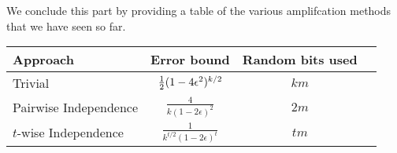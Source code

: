 We conclude this part by providing a table of the various amplifcation methods that we have seen so far.

\renewcommand{\arraystretch}{2}
\begin{center}
\begin{tabular}{|l|c|c|c|}
\hline 
Approach & Error bound & Random bits used  \\ 
\hline 
Trivial & $\frac{1}{2}(1-4\epsilon^2)^{k/2}$ & $km$ \\ 
\hline 
Pairwise Independence & $\frac{\displaystyle 4}{\displaystyle k(1-2\epsilon)^2}$ & $2m$ \\ 
\hline
$t$-wise Independence & $\frac{\displaystyle 1}{\displaystyle k^{t/2}(1-2\epsilon)^t}$ & $tm$ \\ 
\hline
\end{tabular} 
\end{center}
\renewcommand{\arraystretch}{1}
